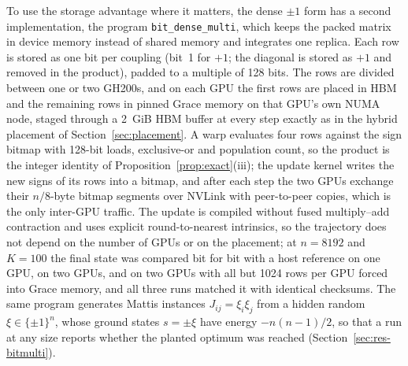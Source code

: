 \documentclass[11pt,a4paper]{article}
\newcommand{\code}[1]{\texttt{#1}}
\begin{document}
To use the storage advantage where it matters, the dense $\pm1$ form has a second implementation, the program \code{bit\_dense\_multi}, which keeps the packed matrix in device memory instead of shared memory and integrates one replica. Each row is stored as one bit per coupling (bit~1 for $+1$; the diagonal is stored as $+1$ and removed in the product), padded to a multiple of 128 bits. The rows are divided between one or two GH200s, and on each GPU the first rows are placed in HBM and the remaining rows in pinned Grace memory on that GPU's own NUMA node, staged through a 2~GiB HBM buffer at every step exactly as in the hybrid placement of Section~\ref{sec:placement}. A warp evaluates four rows against the sign bitmap with 128-bit loads, exclusive-or and population count, so the product is the integer identity of Proposition~\ref{prop:exact}(iii); the update kernel writes the new signs of its rows into a bitmap, and after each step the two GPUs exchange their $n/8$-byte bitmap segments over NVLink with peer-to-peer copies, which is the only inter-GPU traffic. The update is compiled without fused multiply--add contraction and uses explicit round-to-nearest intrinsics, so the trajectory does not depend on the number of GPUs or on the placement; at $n=8192$ and $K=100$ the final state was compared bit for bit with a host reference on one GPU, on two GPUs, and on two GPUs with all but 1024 rows per GPU forced into Grace memory, and all three runs matched it with identical checksums. The same program generates Mattis instances $J_{ij}=\xi_i\xi_j$ from a hidden random $\xi\in\{\pm1\}^n$, whose ground states $s=\pm\xi$ have energy $-n(n-1)/2$, so that a run at any size reports whether the planted optimum was reached (Section~\ref{sec:res-bitmulti}).
\end{document}

